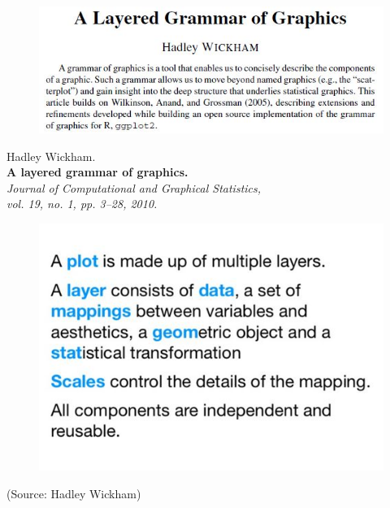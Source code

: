 \documentclass{beamer}
\begin{document}
\begin{frame}

\begin{figure}
\centering
\includegraphics[width=1.1\linewidth]{HWpaper}
\end{figure}
\begin{framed}
Hadley Wickham.\\
\textbf{A layered grammar of graphics.}\\
\textit{Journal of Computational and Graphical Statistics, \\ vol. 19, no. 1, pp. 3–28, 2010.}
\end{framed}

\end{frame}
\begin{frame}[fragile]
	\begin{figure}
\centering
\includegraphics[width=1.1\linewidth]{ggplot2-info}
\end{figure}
(Source: Hadley Wickham)
\end{frame}
\end{document}
